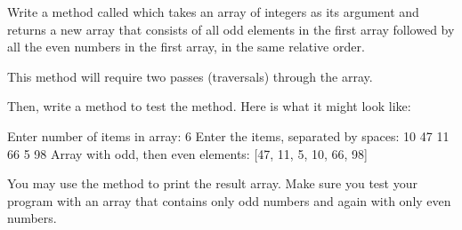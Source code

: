 \begin{exercise}
Write a method called  which takes an array of integers as its argument and returns a new array that consists of all odd elements in the first array followed by all the even numbers in the first array, in the same relative order.

This method will require two passes (traversals) through the array.

Then, write a  method to test the  method. Here is what it
might look like:

\begin{stdout}
Enter number of items in array: 6
Enter the items, separated by spaces: 10 47 11 66 5 98
Array with odd, then even elements: [47, 11, 5, 10, 66, 98]
\end{stdout}

You may use the  method to print the result array. Make sure you test your program with an array that contains only odd numbers and again with only even numbers.

\end{exercise}

